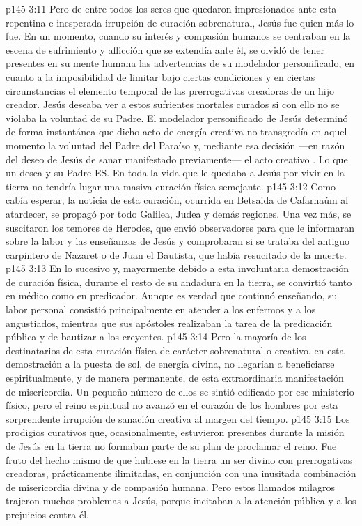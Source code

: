 \vs p145 3:11 \pc Pero de entre todos los seres que quedaron impresionados ante esta repentina e inesperada irrupción de curación sobrenatural, Jesús fue quien más lo fue. En un momento, cuando su interés y compasión humanos se centraban en la escena de sufrimiento y aflicción que se extendía ante él, se olvidó de tener presentes en su mente humana las advertencias de su modelador personificado, en cuanto a la imposibilidad de limitar bajo ciertas condiciones y en ciertas circunstancias el elemento temporal de las prerrogativas creadoras de un hijo creador. Jesús deseaba ver a estos sufrientes mortales curados si con ello no se violaba la voluntad de su Padre. El modelador personificado de Jesús determinó de forma instantánea que dicho acto de energía creativa no transgredía en aquel momento la voluntad del Padre del Paraíso y, mediante esa decisión ---en razón del deseo de Jesús de sanar manifestado previamente--- el acto creativo . Lo que un  desea y su Padre  ES. En toda la vida que le quedaba a Jesús por vivir en la tierra no tendría lugar una masiva curación física semejante.
\vs p145 3:12 \pc Como cabía esperar, la noticia de esta curación, ocurrida en Betsaida de Cafarnaúm al atardecer, se propagó por todo Galilea, Judea y demás regiones. Una vez más, se suscitaron los temores de Herodes, que envió observadores para que le informaran sobre la labor y las enseñanzas de Jesús y comprobaran si se trataba del antiguo carpintero de Nazaret o de Juan el Bautista, que había resucitado de la muerte.
\vs p145 3:13 En lo sucesivo y, mayormente debido a esta involuntaria demostración de curación física, durante el resto de su andadura en la tierra, se convirtió tanto en médico como en predicador. Aunque es verdad que continuó enseñando, su labor personal consistió principalmente en atender a los enfermos y a los angustiados, mientras que sus apóstoles realizaban la tarea de la predicación pública y de bautizar a los creyentes.
\vs p145 3:14 Pero la mayoría de los destinatarios de esta curación física de carácter sobrenatural o creativo, en esta demostración a la puesta de sol, de energía divina, no llegarían a beneficiarse espiritualmente, y de manera permanente, de esta extraordinaria manifestación de misericordia. Un pequeño número de ellos se sintió edificado por ese ministerio físico, pero el reino espiritual no avanzó en el corazón de los hombres por esta sorprendente irrupción de sanación creativa al margen del tiempo.
\vs p145 3:15 Los prodigios curativos que, ocasionalmente, estuvieron presentes durante la misión de Jesús en la tierra no formaban parte de su plan de proclamar el reino. Fue fruto del hecho mismo de que hubiese en la tierra un ser divino con prerrogativas creadoras, prácticamente ilimitadas, en conjunción con una inusitada combinación de misericordia divina y de compasión humana. Pero estos llamados milagros trajeron muchos problemas a Jesús, porque incitaban a la atención pública y a los prejuicios contra él.
